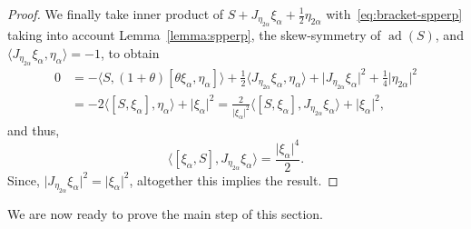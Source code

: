 \documentclass[12pt, a4paper]{amsart}
\newcommand{\ad}{\operatorname{ad}}
\theoremstyle{definition}
\begin{document}
\begin{proof}
We finally take inner product of $S+J_{\eta_{2\alpha}}\xi_\alpha+\frac{1}{2}\eta_{2\alpha}$ with~\eqref{eq:bracket-spperp} taking into account Lemma~\ref{lemma:spperp}, the skew-symmetry of $\ad(S)$, and $\langle J_{\eta_{2\alpha}}\xi_\alpha,\eta_\alpha\rangle=-1$, to obtain
\begin{align*}
0&{}=-\langle S,(1+\theta)[\theta\xi_\alpha,\eta_\alpha]\rangle
+\frac{1}{2}\langle J_{\eta_{2\alpha}}\xi_\alpha,\eta_\alpha\rangle
+\lvert J_{\eta_{2\alpha}}\xi_\alpha\rvert^2+\frac{1}{4}\lvert\eta_{2\alpha}\rvert^2\\
&{}=-2\langle[S,\xi_\alpha],\eta_\alpha\rangle+\lvert\xi_\alpha\rvert^2
=\frac{2}{\lvert\xi_\alpha\rvert^2}\langle[S,\xi_\alpha],J_{\eta_{2\alpha}}\xi_\alpha\rangle
+\lvert\xi_\alpha\rvert^2,
\end{align*}
and thus,
\[
\langle[\xi_\alpha,S],J_{\eta_{2\alpha}}\xi_\alpha\rangle=\frac{\lvert\xi_\alpha\rvert^4}{2}.
\]
Since, $\lvert J_{\eta_{2\alpha}}\xi_\alpha\rvert^2=\lvert\xi_\alpha\rvert^2$, altogether this implies the result.
\end{proof}

We are now ready to prove the main step of this section.
\end{document}

